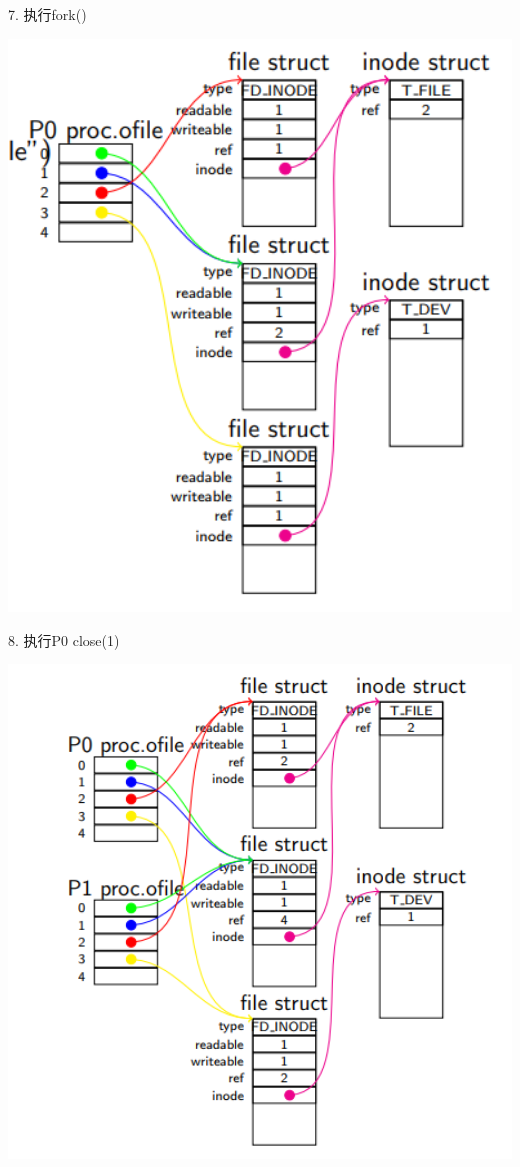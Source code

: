 7. 执行fork()

\includegraphics[width=6in]{figures/eg_file/image162.png}

8. 执行P0 close(1)

\includegraphics[width=6in]{figures/eg_file/image163.png}

